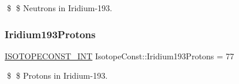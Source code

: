 \$ \$ Neutrons in Iridium-\/193. \mbox{\label{group___isotope_const-_iridium-_ir193_ga09cf853c96bc71826d4fdd18a5e52fe9}} 
\subsubsection{\texorpdfstring{Iridium193\+Protons}{Iridium193Protons}}
{\footnotesize\ttfamily \mbox{\hyperlink{group___isotope_const-_macros_ga5f18360b3e99483a35c32d789e62621c}{I\+S\+O\+T\+O\+P\+E\+C\+O\+N\+S\+T\+\_\+\+I\+NT}} Isotope\+Const\+::\+Iridium193\+Protons = 77}

\$ \$ Protons in Iridium-\/193. 